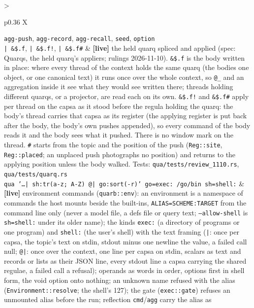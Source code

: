 \documentclass{report}
\newcommand{\live}{\textbf{\textcolor{blue!60!black}{[live]}}\xspace}
\begin{document}
\begin{xltabular}{\textwidth}{>{\raggedright\arraybackslash}p{0.36\textwidth} X}
    \texttt{agg-push}, \texttt{agg-record}, \texttt{agg-recall},
    \texttt{seed}, \texttt{option} \\
\texttt{| \&\$.f}, \texttt{| \&\$.f!}, \texttt{| \&\$.f\#}
  & \live the held quarq spliced and applied (spec: Quarqs, the held
    quarq's appliers; rulings 2026-11-10). \texttt{\&\$.f} is the
    body written in place: where every thread of the context holds
    the same quarq (the bodies one object, or one canonical text)
    it runs once over the whole context, so \texttt{@\_} and an
    aggregation inside it see what they would see written there;
    threads holding different quarqs, or a projector, are read each
    on its own. \texttt{\&\$.f!} and \texttt{\&\$.f\#} apply per
    thread on the capsa as it stood before the regula holding the
    quarq: the body's thread carries that capsa as its register
    (the applying register is put back after the body, the body's
    own pushes appended), so every command of the body reads it and
    the body sees what it pushed. There is no window mark on the
    thread. \texttt{\#} starts from the topic and the position of
    the push (\texttt{Reg::site}, \texttt{Reg::placed}; an unplaced
    push photographs no position) and returns to the applying
    position unless the body walked. Tests:
    \texttt{qua/tests/review\_1110.rs}, \texttt{qua/tests/quarq.rs} \\
\texttt{qua '…| sh:tr(a-z; A-Z) @| go:sort(-r)' go=exec:~/go/bin sh=shell:}
  & \live environment commands (\texttt{quarb::env}): an
    environment is a namespace of commands the host mounts beside
    the built-ins, \texttt{ALIAS=SCHEME:TARGET} from the command
    line only (never a model file, a defs file or query text;
    \texttt{--allow-shell} is \texttt{sh=shell:} under its older
    name); the kinds \texttt{exec:} (a directory of programs or one
    program) and \texttt{shell:} (the user's shell) with the text
    framing (\texttt{|}: once per capsa, the topic's text on stdin,
    stdout minus one newline the value, a failed call null;
    \texttt{@|}: once over the context, one line per capsa on stdin,
    scalars as text and records or lists as their JSON line, every
    stdout line a capsa carrying the shared regulae, a failed call a
    refusal); operands as words in order, options first in shell
    form, the void option onto nothing; an unknown name refused with
    the alias (\texttt{Environment::resolve}; the shell's 127); the
    gate (\texttt{exec::gate}) refuses an unmounted alias before the
    run; reflection \texttt{cmd}/\texttt{agg} carry the alias as

\end{xltabular}
\end{document}
